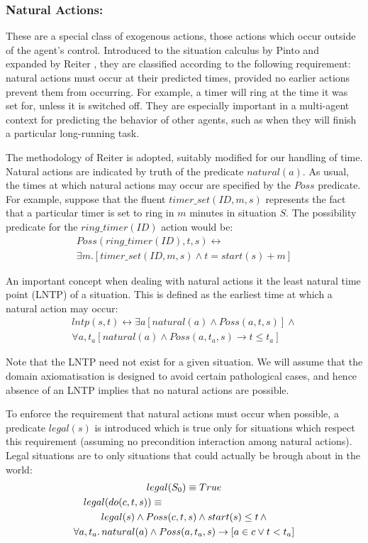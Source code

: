 \documentclass[letterpaper]{article}
\begin{document}
\subsubsection{Natural Actions:}
These are a special class of exogenous actions, those
actions which occur outside of the agent's control.
Introduced to the situation
calculus by Pinto \cite{pinto94temporal} and expanded by Reiter \cite{reiter96sc_nat_conc},
they are classified according to the following requirement: natural
actions must occur at their predicted times, provided no earlier actions
prevent them from occurring. For example, a timer will ring at the
time it was set for, unless it is switched off.
They are especially important in a multi-agent context for predicting the
behavior of other agents, such as when they will finish a particular
long-running task.

The methodology of Reiter is adopted, suitably
modified for our handling of time. Natural actions are indicated by
truth of the predicate $natural(a)$. As usual, the times at which
natural actions may occur are specified by the $Poss$ predicate.
For example, suppose that the fluent $timer\_set(ID,m,s)$ represents
the fact that a particular timer is set to ring in $m$ minutes in
situation $S$. The possibility predicate for the $ring\_timer(ID)$
action would be:
\begin{multline}
Poss(ring\_timer(ID),t,s)\leftrightarrow\\
\exists m.\left[timer\_set(ID,m,s)\wedge t=start(s)+m\right]
\end{multline}

An important concept when dealing with natural actions it the least
natural time point (LNTP) of a situation. This is defined as the earliest
time at which a natural action may occur:
\begin{multline}
\label{eqn:lntp_def}
lntp(s,t)\leftrightarrow \exists a\left[natural(a)\wedge Poss(a,t,s)\right]\wedge\\
\forall a,t_{a}\left[natural(a)\wedge Poss(a,t_{a},s)\rightarrow t\leq t_{a}\right]
\end{multline}

Note that the LNTP need not exist for a given situation.
We will assume that the domain axiomatisation
is designed to avoid certain pathological cases, and hence absence of an
LNTP implies that no natural actions are possible.

To enforce the requirement that natural actions must occur when possible,
a predicate $legal(s)$ is introduced which is true only for situations
which respect this requirement (assuming no precondition interaction
among natural actions).  Legal situations are to only situations that could
actually be brough about in the world:
\begin{multline}
\label{eqn:legal_def}
legal(S_{0}) \equiv True\\
\shoveleft{legal(do(c,t,s)) \equiv}\\
legal(s)\wedge Poss(c,t,s)\wedge start(s)\leq t \, \wedge\\
\forall a,t_{a}.\,natural(a)\wedge Poss(a,t_{a},s)\rightarrow\left[a\in c\vee t<t_{a}\right]
\end{multline}
\end{document}
